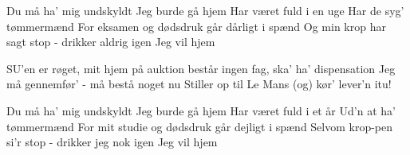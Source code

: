 \documentclass[a4paper,11pt]{article}
\begin{document}
\begin{song}
Du må ha' mig undskyldt
Jeg burde gå hjem
Har været fuld i en uge
Har de syg' tømmermænd
For eksamen og dødsdruk
går dårligt i spænd
Og min krop har sagt stop
- drikker aldrig igen
Jeg vil hjem


SU'en er røget, mit hjem på auktion
består ingen fag, ska' ha' dispensation
Jeg må gennemfør' - må bestå noget nu
Stiller op til Le Mans (og) kør' lever'n itu!

Du må ha' mig undskyldt
Jeg burde gå hjem
Har været fuld i et år
Ud'n at ha' tømmermænd
For mit studie og dødsdruk
går dejligt i spænd
Selvom krop-pen si'r stop
- drikker jeg nok igen
Jeg vil hjem


\end{song}
\end{document}
